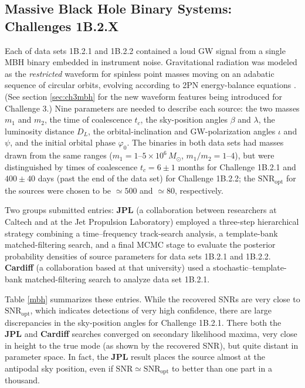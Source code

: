 \documentclass{iopart}
\begin{document}
\subsection{Massive Black Hole Binary Systems: Challenges 1B.2.X}

Each of data sets 1B.2.1 and 1B.2.2 contained a loud GW signal from a single MBH binary embedded in instrument noise. Gravitational radiation was modeled as the \emph{restricted} waveform for spinless point masses moving on an adabatic sequence of circular orbits, evolving according to 2PN energy-balance equations \cite[sec.\ 4.4]{mldcgwdaw2}. (See section \ref{sec:ch3mbh} for the new waveform features being introduced for Challenge 3.) Nine parameters are needed to describe each source: the two masses $m_1$ and $m_2$, the time of coalescence $t_c$, the sky-position angles $\beta$ and $\lambda$, the luminosity distance $D_L$, the orbital-inclination and GW-polarization angles $\iota$ and $\psi$, and the initial orbital phase $\varphi_0$. 
The binaries in both data sets had masses drawn from the same ranges ($m_1 = 1\mbox{--}5 \times 10^6\,M_{\odot}$, $m_1/m_2 = 1\mbox{--}4$), but were distinguished by times of coalescence $t_c = 6\pm 1$ months for Challenge 1B.2.1 and $400 \pm 40$ days (past the end of the data set) for Challenge 1B.2.2; the $\mathrm{SNR}_\mathrm{opt}$ for the sources were chosen to be $\simeq 500$ and $\simeq 80$, respectively.

Two groups submitted entries: \textbf{JPL} (a collaboration between researchers at Caltech and at the Jet Propulsion Laboratory) employed a three-step hierarchical strategy combining a time--frequency track-search analysis, a template-bank matched-filtering search, and a final MCMC stage to evaluate the posterior probability densities of source parameters for data sets 1B.2.1 and 1B.2.2. \textbf{Cardiff} (a collaboration based at that university) used a stochastic--template-bank matched-filtering search \cite{cardiffmbh} to analyze data set 1B.2.1.

Table \ref{mbh} summarizes these entries. While the recovered SNRs are very close to $\mathrm{SNR}_\mathrm{opt}$, which indicates detections of very high confidence, there are large discrepancies in the sky-position angles for Challenge 1B.2.1. There both the \textbf{JPL} and \textbf{Cardiff} searches converged on secondary likelihood maxima, very close in height to the true mode (as shown by the recovered SNR), but quite distant in parameter space.
In fact, the \textbf{JPL} result places the source almost at the antipodal sky position, even if $\mathrm{SNR} \simeq \mathrm{SNR}_\mathrm{opt}$ to better than one part in a thousand.
\end{document}
